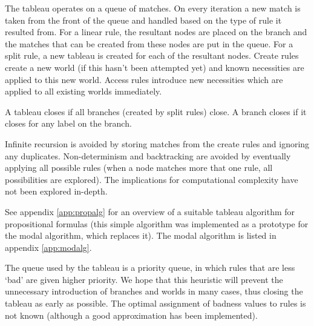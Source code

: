 The tableau operates on a queue of matches. On every iteration a new match is
taken from the front of the queue and handled based on the type of rule it
resulted from. For a linear rule, the resultant nodes are placed on the branch
and the matches that can be created from these nodes are put in the queue. For
a split rule, a new tableau is created for each of the resultant nodes. Create
rules create a new world (if this hasn't been attempted yet) and known
necessities are applied to this new world. Access rules introduce new
necessities which are applied to all existing worlds immediately.

A tableau closes if all branches (created by split rules) close. A branch
closes if it closes for any label on the branch.

Infinite recursion is avoided by storing matches from the create rules and
ignoring any duplicates. Non-determinism and backtracking are avoided by
eventually applying all possible rules (when a node matches more that one
rule, all possibilities are explored). The implications for computational
complexity have not been explored in-depth.

See appendix \ref{app:propalg} for an overview of a suitable tableau algorithm
for propositional formulas (this simple algorithm was implemented as a
prototype for the modal algorithm, which replaces it). The modal algorithm is
listed in appendix \ref{app:modalg}.

The queue used by the tableau is a priority queue, in which rules that are
less `bad' are given higher priority. We hope that this heuristic will prevent
the unnecessary introduction of branches and worlds in many cases, thus
closing the tableau as early as possible. The optimal assignment of badness
values to rules is not known (although a good approximation has been
implemented).
